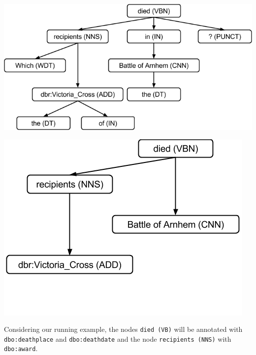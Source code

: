 \begin{minipage}{0.57\textwidth} 
\centering
\includegraphics[width=\linewidth]{part_03/ESWC_HAWK/hawk_tree_full}
\label{chahawk:fig:dependency_tree}
\end{minipage}
\hfill
\begin{minipage}{0.36\textwidth}
\centering
\includegraphics[width=\linewidth]{part_03/ESWC_HAWK/hawk_tree_pruned}
\label{chahawk:fig:prunedtree}
\end{minipage}


Considering our running example, the nodes \texttt{died (VB)} will be annotated with \texttt{dbo:deathplace} and \texttt{dbo:deathdate} and the node \texttt{recipients (NNS)} with \texttt{dbo:award}.

